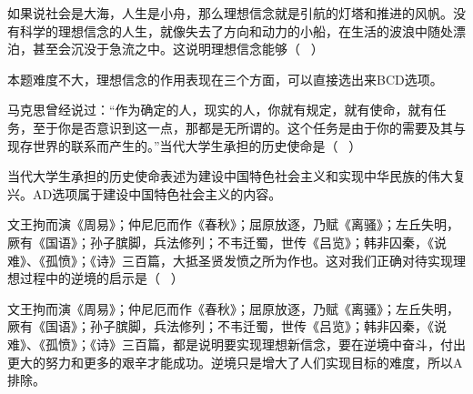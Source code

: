 \question 如果说社会是大海，人生是小舟，那么理想信念就是引航的灯塔和推进的风帆。没有科学的理想信念的人生，就像失去了方向和动力的小船，在生活的波浪中随处漂泊，甚至会沉没于急流之中。这说明理想信念能够（
~）
\par{}
\begin{solution}本题难度不大，理想信念的作用表现在三个方面，可以直接选出来BCD选项。
\end{solution}
\question 马克思曾经说过：``作为确定的人，现实的人，你就有规定，就有使命，就有任务，至于你是否意识到这一点，那都是无所谓的。这个任务是由于你的需要及其与现存世界的联系而产生的。''当代大学生承担的历史使命是（
~）
\par{}
\begin{solution}当代大学生承担的历史使命表述为建设中国特色社会主义和实现中华民族的伟大复兴。AD选项属于建设中国特色社会主义的内容。
\end{solution}
\question 文王拘而演《周易》；仲尼厄而作《春秋》；屈原放逐，乃赋《离骚》；左丘失明，厥有《国语》；孙子膑脚，兵法修列；不韦迁蜀，世传《吕览》；韩非囚秦，《说难》、《孤愤》；《诗》三百篇，大抵圣贤发愤之所为作也。这对我们正确对待实现理想过程中的逆境的启示是（
~）
\par{}
\begin{solution}文王拘而演《周易》；仲尼厄而作《春秋》；屈原放逐，乃赋《离骚》；左丘失明，厥有《国语》；孙子膑脚，兵法修列；不韦迁蜀，世传《吕览》；韩非囚秦，《说难》、《孤愤》；《诗》三百篇，都是说明要实现理想新信念，要在逆境中奋斗，付出更大的努力和更多的艰辛才能成功。逆境只是增大了人们实现目标的难度，所以A排除。
\end{solution}
